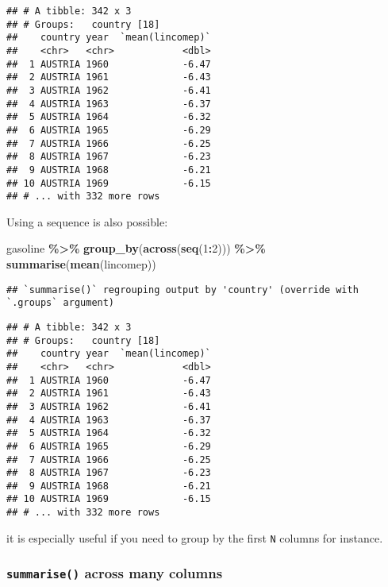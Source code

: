 \documentclass[
]{article}
\newenvironment{Shaded}{\begin{snugshade}}{\end{snugshade}}
\newcommand{\DecValTok}[1]{\textcolor[rgb]{0.00,0.00,0.81}{#1}}
\newcommand{\KeywordTok}[1]{\textcolor[rgb]{0.13,0.29,0.53}{\textbf{#1}}}
\newcommand{\NormalTok}[1]{#1}
\newcommand{\OperatorTok}[1]{\textcolor[rgb]{0.81,0.36,0.00}{\textbf{#1}}}
\newcommand{\StringTok}[1]{\textcolor[rgb]{0.31,0.60,0.02}{#1}}
\begin{document}
\begin{verbatim}
## # A tibble: 342 x 3
## # Groups:   country [18]
##    country year  `mean(lincomep)`
##    <chr>   <chr>            <dbl>
##  1 AUSTRIA 1960             -6.47
##  2 AUSTRIA 1961             -6.43
##  3 AUSTRIA 1962             -6.41
##  4 AUSTRIA 1963             -6.37
##  5 AUSTRIA 1964             -6.32
##  6 AUSTRIA 1965             -6.29
##  7 AUSTRIA 1966             -6.25
##  8 AUSTRIA 1967             -6.23
##  9 AUSTRIA 1968             -6.21
## 10 AUSTRIA 1969             -6.15
## # ... with 332 more rows
\end{verbatim}

Using a sequence is also possible:

\begin{Shaded}
\begin{Highlighting}[]
\NormalTok{gasoline }\OperatorTok{\%\textgreater{}\%}
\StringTok{  }\KeywordTok{group\_by}\NormalTok{(}\KeywordTok{across}\NormalTok{(}\KeywordTok{seq}\NormalTok{(}\DecValTok{1}\OperatorTok{:}\DecValTok{2}\NormalTok{))) }\OperatorTok{\%\textgreater{}\%}
\StringTok{  }\KeywordTok{summarise}\NormalTok{(}\KeywordTok{mean}\NormalTok{(lincomep))}
\end{Highlighting}
\end{Shaded}

\begin{verbatim}
## `summarise()` regrouping output by 'country' (override with `.groups` argument)
\end{verbatim}

\begin{verbatim}
## # A tibble: 342 x 3
## # Groups:   country [18]
##    country year  `mean(lincomep)`
##    <chr>   <chr>            <dbl>
##  1 AUSTRIA 1960             -6.47
##  2 AUSTRIA 1961             -6.43
##  3 AUSTRIA 1962             -6.41
##  4 AUSTRIA 1963             -6.37
##  5 AUSTRIA 1964             -6.32
##  6 AUSTRIA 1965             -6.29
##  7 AUSTRIA 1966             -6.25
##  8 AUSTRIA 1967             -6.23
##  9 AUSTRIA 1968             -6.21
## 10 AUSTRIA 1969             -6.15
## # ... with 332 more rows
\end{verbatim}

it is especially useful if you need to group by the first \texttt{N} columns for instance.

\hypertarget{summarise-across-many-columns}{%
\subsubsection{\texorpdfstring{\texttt{summarise()} across many columns}{summarise() across many columns}}\label{summarise-across-many-columns}}
\end{document}
